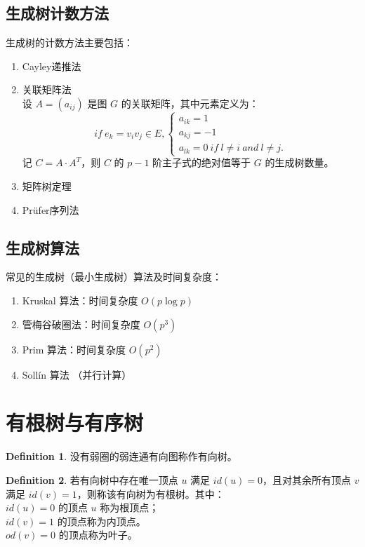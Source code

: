 \documentclass[oneside]{book}
\theoremstyle{definition}
\newtheorem{definition}{Definition}[section]
\begin{document}
\subsection{生成树计数方法}
生成树的计数方法主要包括：
\begin{enumerate}
	\item Cayley递推法
	\item 关联矩阵法\\
	设 \( A = (a_{ij}) \) 是图 \( G \) 的关联矩阵，其中元素定义为：
	\[
	if\ e_k=v_iv_j\in E,
	\begin{cases}
		a_{ik}=1 \\
		a_{kj}=-1 \\
		a_{lk}=0\ if\ l\neq i\ and\ l\neq j.
	\end{cases}
	\]
	记 \( C = A \cdot A^T \)，则 \( C \) 的 \( p-1 \) 阶主子式的绝对值等于 \( G \) 的生成树数量。
	\item 矩阵树定理
	\item Prüfer序列法
\end{enumerate}


\subsection{生成树算法}
常见的生成树（最小生成树）算法及时间复杂度：
\begin{enumerate}
	\item Kruskal 算法：时间复杂度 \( O(p\log p) \)
	\item 管梅谷破圈法：时间复杂度 \( O(p^3) \)
	\item Prim 算法：时间复杂度 \( O(p^2) \)
	\item Sollín 算法 （并行计算）
\end{enumerate}

\section{有根树与有序树}

\begin{definition}
	没有弱圈的弱连通有向图称作有向树。
\end{definition}

\begin{definition}
	若有向树中存在唯一顶点 \( u \) 满足 \( id(u) = 0 \)，且对其余所有顶点 \( v \) 满足 \( id(v) = 1 \)，则称该有向树为有根树。其中：\\
	 \( id(u) = 0 \) 的顶点 \( u \) 称为根顶点；\\
	\( id(v) = 1 \) 的顶点称为内顶点。\\
	\( od(v) = 0 \) 的顶点称为叶子。
\end{definition}
\end{document}
